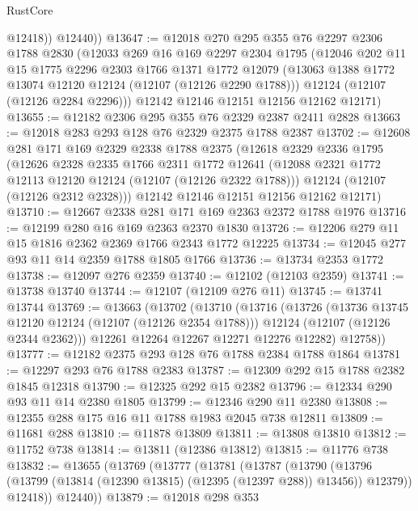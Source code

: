 \begin{lexlean}{RustCore}
\begin{coremodule}
            @12418))
        @12440))
@13647 := @12018
    @270
    @295
    @355
    @76
    @2297
    @2306
    @1788
    @2830
    (@12033
      @269
      @16
      @169
      @2297
      @2304
      @1795
      (@12046
        @202
        @11
        @15
        @1775
        @2296
        @2303
        @1766
        @1371
        @1772
        @12079
        (@13063 @1388 @1772 @13074 @12120 @12124 (@12107 (@12126 @2290 @1788)))
        @12124
        (@12107 (@12126 @2284 @2296)))
      @12142
      @12146
      @12151
      @12156
      @12162
      @12171)
@13655 := @12182 @2306 @295 @355 @76 @2329 @2387 @2411 @2828
@13663 := @12018 @283 @293 @128 @76 @2329 @2375 @1788 @2387
@13702 := @12608
    @281
    @171
    @169
    @2329
    @2338
    @1788
    @2375
    (@12618
      @2329
      @2336
      @1795
      (@12626
        @2328
        @2335
        @1766
        @2311
        @1772
        @12641
        (@12088 @2321 @1772 @12113 @12120 @12124 (@12107 (@12126 @2322 @1788)))
        @12124
        (@12107 (@12126 @2312 @2328)))
      @12142
      @12146
      @12151
      @12156
      @12162
      @12171)
@13710 := @12667 @2338 @281 @171 @169 @2363 @2372 @1788 @1976
@13716 := @12199 @280 @16 @169 @2363 @2370 @1830
@13726 := @12206 @279 @11 @15 @1816 @2362 @2369 @1766 @2343 @1772 @12225
@13734 := @12045 @277 @93 @11 @14 @2359 @1788 @1805 @1766
@13736 := @13734 @2353 @1772
@13738 := @12097 @276 @2359
@13740 := @12102 (@12103 @2359)
@13741 := @13738 @13740
@13744 := @12107 (@12109 @276 @11)
@13745 := @13741 @13744
@13769 := @13663
    (@13702
      (@13710
        (@13716
          (@13726
            (@13736 @13745 @12120 @12124 (@12107 (@12126 @2354 @1788)))
            @12124
            (@12107 (@12126 @2344 @2362)))
          @12261
          @12264
          @12267
          @12271
          @12276
          @12282)
        @12758))
@13777 := @12182 @2375 @293 @128 @76 @1788 @2384 @1788 @1864
@13781 := @12297 @293 @76 @1788 @2383
@13787 := @12309 @292 @15 @1788 @2382 @1845 @12318
@13790 := @12325 @292 @15 @2382
@13796 := @12334 @290 @93 @11 @14 @2380 @1805
@13799 := @12346 @290 @11 @2380
@13808 := @12355 @288 @175 @16 @11 @1788 @1983 @2045 @738 @12811
@13809 := @11681 @288
@13810 := @11878 @13809
@13811 := @13808 @13810
@13812 := @11752 @738
@13814 := @13811 (@12386 @13812)
@13815 := @11776 @738
@13832 := @13655
    (@13769
      (@13777
        (@13781
          (@13787
            (@13790 (@13796 (@13799 (@13814 (@12390 @13815) (@12395 (@12397 @288)) @13456)) @12379))
            @12418))
        @12440))
@13879 := @12018
    @298
    @353

\end{coremodule}
\end{lexlean}
